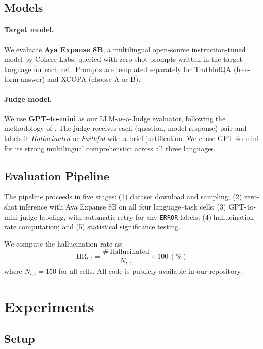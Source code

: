 \documentclass[11pt]{article}
\begin{document}
\subsection{Models}

\paragraph{Target model.} We evaluate \textbf{Aya Expanse 8B}, a multilingual
open-source instruction-tuned model by Cohere Labs, queried with zero-shot prompts
written in the target language for each cell.
Prompts are templated separately for TruthfulQA (free-form answer) and XCOPA
(choose A or B).

\paragraph{Judge model.} We use \textbf{GPT-4o-mini} as our LLM-as-a-Judge
evaluator, following the methodology of \citet{kang-etal-2024-comparing}. The judge
receives each (question, model response) pair and labels it \textit{Hallucinated} or
\textit{Faithful} with a brief justification. We chose GPT-4o-mini for its strong
multilingual comprehension across all three languages.

\subsection{Evaluation Pipeline}

The pipeline proceeds in five stages: (1) dataset download and sampling; (2) zero-shot
inference with Aya Expanse 8B on all four language--task cells; (3) GPT-4o-mini judge
labeling, with automatic retry for any \texttt{ERROR} labels; (4) hallucination rate
computation; and (5) statistical significance testing.

We compute the hallucination rate as:
\[
\mathrm{HR}_{l,t} = \frac{\#\,\text{Hallucinated}}{N_{l,t}} \times 100\,(\%)
\]
where $N_{l,t} = 150$ for all cells. All code is publicly available in our
repository.

\section{Experiments}

\subsection{Setup}
\end{document}
